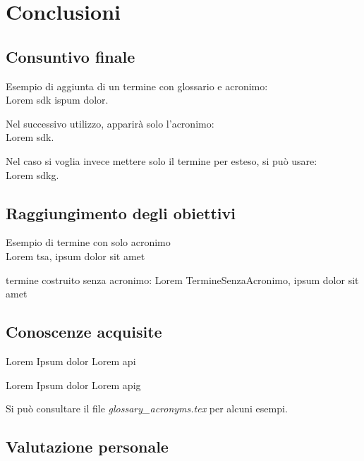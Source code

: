 \chapter{Conclusioni}
\label{chap:conclusioni}

\section{Consuntivo finale}
Esempio di aggiunta di un termine con glossario e acronimo:\\
Lorem \gls{sdk} ispum dolor.

Nel successivo utilizzo, apparirà solo l'acronimo:\\
Lorem \gls{sdk}.

Nel caso si voglia invece mettere solo il termine per esteso, si può usare:\\
Lorem \gls{sdkg}.

\section{Raggiungimento degli obiettivi}
Esempio di termine con solo acronimo\\
Lorem \gls{tsa}, ipsum dolor sit amet

termine costruito senza acronimo:
Lorem \gls{TermineSenzaAcronimo}, ipsum dolor sit amet

\section{Conoscenze acquisite}
Lorem Ipsum dolor Lorem \gls{api}

Lorem Ipsum dolor Lorem \gls{apig}

Si può consultare il file \textit{glossary\_acronyms.tex} per alcuni esempi.

\section{Valutazione personale}
